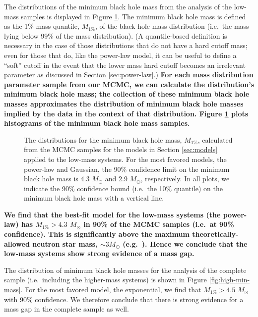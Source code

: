 \documentclass[preprint]{aastex}
\newcommand{\Msun}{M_\odot}
\newcommand{\changed}[1]{{\bf #1 }}
\begin{document}
The distributions of the minimum black hole mass from the analysis of
the low-mass samples is displayed in Figure \ref{fig:min-mass}.  The
minimum black hole mass is defined as the 1\% mass quantile,
$M_{1\%}$, of the black-hole mass distribution (i.e.\ the mass lying
below 99\% of the mass distribution).  (A quantile-based definition is
necessary in the case of those distributions that do not have a hard
cutoff mass; even for those that do, like the power-law model, it can
be useful to define a ``soft'' cutoff in the event that the lower mass
hard cutoff becomes an irrelevant parameter as discussed in Section
\ref{sec:power-law}.)  \changed{For each mass distribution parameter
  sample from our MCMC, we can calculate the distribution's minimum
  black hole mass; the collection of these minimum black hole masses
  approximates the distribution of minimum black hole masses implied
  by the data in the context of that distribution.  Figure
  \ref{fig:min-mass} plots histograms of the minimum black hole mass
  samples.}

\begin{figure}
  \begin{center}
  \end{center}
  \caption{\label{fig:min-mass} The distributions for the minimum
    black hole mass, $M_{1\%}$, calculated from the MCMC samples for
    the models in Section \ref{sec:models} applied to the low-mass
    systems.  For the most favored models, the power-law and Gaussian,
    the 90\% confidence limit on the minimum black hole mass is 4.3
    $\Msun$ and 2.9 $\Msun$, respectively.  In all plots, we indicate
    the 90\% confidence bound (i.e.\ the 10\% quantile) on the minimum
    black hole mass with a vertical line.}
\end{figure}

\changed{We find that the best-fit model for the low-mass systems (the
  power-law) has $M_{1\%} > 4.3$ $\Msun$ in 90\% of the MCMC samples
  (i.e.\ at 90\% confidence).  This is significantly above the maximum
  theoretically-allowed neutron star mass, $\sim 3 \Msun$ (e.g.\
  \citet{Kalogera1996}).  Hence we conclude that the low-mass systems
  show strong evidence of a mass gap.

  The distribution of minimum black hole masses for the analysis of
  the complete sample (i.e.\ including the higher-mass systems) is
  shown in Figure \ref{fig:high-min-mass}.  For the most favored
  model, the exponential, we find that $M_{1\%} > 4.5$ $\Msun$ with
  90\% confidence.  We therefore conclude that there is strong
  evidence for a mass gap in the complete sample as well.}
\end{document}
